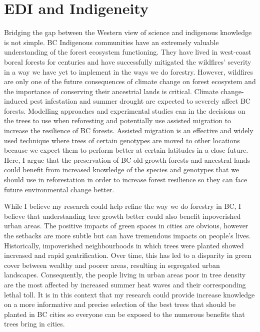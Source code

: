 \documentclass[11pt,letter]{article}
\begin{document}
\section *{EDI and Indigeneity}
Bridging the gap between the Western view of science and indigenous knowledge is not simple. BC Indigenous communities have an extremely valuable understanding of the forest ecosystem functioning. They have lived in west-coast boreal forests for centuries and have successfully mitigated the wildfires' severity in a way we have yet to implement in the ways we do forestry. However, wildfires are only one of the future consequences of climate change on forest ecosystem and the importance of conserving their ancestrial lands is critical. Climate change-induced pest infestation and summer drought are expected to severely affect BC forests. Modelling approaches and experimental studies can in the decisions on the trees to use when reforesting and potentially use assisted migration to increase the resilience of BC forests. Assisted migration is an effective and widely used technique where trees of certain genotypes are moved to other locations because we expect them to perform better at certain latitudes in a close future. Here, I argue that the preservation of BC old-growth forests and ancestral lands could benefit from increased knowledge of the species and genotypes that we should use in reforestation in order to increase forest resilience so they can face future environmental change better.
\par 
While I believe my research could help refine the way we do forestry in BC, I believe that understanding tree growth better could also benefit inpoverished urban areas. The positive impacts of green spaces in cities are obvious, however the setbacks are more subtle but can have tremendous impacts on people's lives. Historically, impoverished neighbourhoods in which trees were planted showed increased and rapid gentrification. Over time, this has led to a disparity in green cover between wealthy and poorer areas, resulting in segregated urban landscapes. Consequently, the people living in urban areas poor in tree density are the most affected by increased summer heat waves and their corresponding lethal toll. It is in this context that my research could provide increase knowledge on a more informative and precise selection of the best trees that should be planted in BC cities so everyone can be exposed to the numerous benefits that trees bring in cities. 

\end{document}

